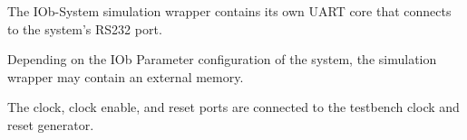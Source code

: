 %

The IOb-System simulation wrapper contains its own UART core that connects to the system's RS232 port.

Depending on the IOb Parameter configuration of the system, the simulation wrapper may contain an external memory.

The clock, clock enable, and reset ports are connected to the testbench clock and reset generator.
